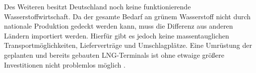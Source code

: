 		Des Weiteren besitzt Deutschland noch keine funktionierende Wasserstoffwirtschaft. 
		Da der gesamte Bedarf an grünem Wasserstoff nicht durch nationale Produktion gedeckt werden kann, muss die Differenz aus anderen Ländern importiert werden.
		Hierfür gibt es jedoch keine massentauglichen Transportmöglichkeiten, Lieferverträge und Umschlagplätze.
		Eine Umrüstung der geplanten und bereits gebauten LNG-Terminals ist ohne etwaige größere Investitionen nicht problemlos möglich \cite{Frauenhofer_LNG}. 
		\clearpage
		
		
			
		
		